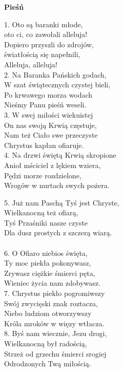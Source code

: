 \documentclass[10pt,a5paper]{book}
\newcommand{\oremus}[3]{\medskip\centerline{\textbf{#1}}\medskip
	\begin{sloppypar}
		\begin{paracol}{2}
			\setlength{\columnsep}{0em}
			\begin{leftcolumn}
				#2
			\end{leftcolumn}
			\begin{rightcolumn}
				#3
			\end{rightcolumn}
		\end{paracol}
	\end{sloppypar}}
\begin{document}
					\oremus{Pieśń}{
						1. Oto są baranki młode,\\
						oto ci, co zawołali alleluja!\\
						Dopiero przyszli do zdrojów,\\
						światłością się napełnili,  \\
						Alleluja, alleluja!\\
						
						2. Na Baranka Pańskich godach,\\
						W szat świątecznych czystej bieli,  \\
						Po krwawego morza wodach\\
						Nieśmy Panu pieśń weseli.\\
						
						3. W swej miłości wiekuistej\\
						On nas swoją Krwią częstuje,\\
						Nam też Ciało swe przeczyste\\
						Chrystus kapłan ofiaruje.\\ 
					
						4. Na drzwi świętą Krwią skropione\\
						Anioł mściciel z lękiem wziera,\\
						Pędzi morze rozdzielone,\\
						Wrogów w nurtach swych pożera.}{
						5. Już nam Paschą Tyś jest Chryste,\\ 
						Wielkanocną też ofiarą,\\
						Tyś Przaśniki nasze czyste \\
						Dla dusz prostych z szczerą wiarą.\\ \\
						
						6. O Ofiaro niebios święta,\\
						Ty moc piekła pokonywasz,\\
						Zrywasz ciężkie śmierci pęta,\\
						Wieniec życia nam zdobywasz. \\
						
						7. Chrystus piekło pogromiwszy\\
						Swój zwycięski znak roztacza,\\
						Niebo ludziom otworzywszy\\
						Króla mroków w więzy wtłacza.\\ 
						
						8. Byś nam wiecznie, Jezu drogi, \\
						Wielkanocną był radością,\\
						Strzeż od grzechu śmierci srogiej \\
						Odrodzonych Twą miłością.}
					
\end{document}
